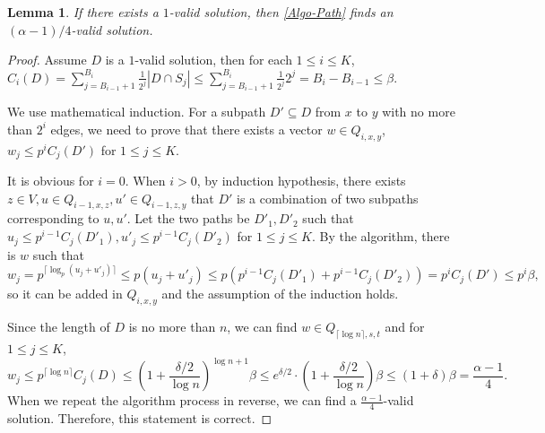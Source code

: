 \documentclass[11pt,a4paper]{article} \usepackage{enumitem}
\newtheorem{lemma}[theorem]{Lemma}
\theoremstyle{definition}
\begin{document}
\begin{lemma}\label{lem:algo-path-1}
If there exists a $1$-valid solution, then \cref{Algo-Path} finds an $(\alpha-1)/4$-valid solution. 
\end{lemma}
\begin{proof}
Assume $D$ is a $1$-valid solution, then for each $1\le i\le K$, $C_i(D)=\sum_{j=B_{i-1}+1}^{B_i} \frac{1}{2^j}|D\cap S_{j}|\le \sum_{j=B_{i-1}+1}^{B_i} \frac{1}{2^j} 2^j=B_i-B_{i-1}\le \beta$. 

We use mathematical induction. For a subpath $D'\subseteq D$ from $x$ to $y$ with no more than $2^i$ edges, we need to prove that there exists a vector $w\in Q_{i,x,y}$, $w_j\le p^i C_j(D')$ for $1\le j\le K$.

It is obvious for $i=0$. When $i>0$, by induction hypothesis, there exists $z\in V, u\in Q_{i-1,x,z},u'\in Q_{i-1,z,y}$ that $D'$ is a combination of two subpaths corresponding to $u,u'$. 
Let the two paths be $D'_1,D'_2$ such that $u_j\le p^{i-1}C_j(D'_1),u'_j\le p^{i-1}C_j(D'_2)$ for $1\le j\le K$.
By the algorithm, there is $w$ such that
$$w_j=p^{\lceil \log_p(u_j+u'_j)\rceil}\le p(u_j+u'_j)\le p(p^{i-1}C_j(D'_1)+p^{i-1}C_j(D'_2))=p^i C_j(D')\le p^i\beta,$$
so it can be added in $Q_{i,x,y}$ and the assumption of the induction holds.

Since the length of $D$ is no more than $n$, we can find $w\in Q_{\lceil \log n\rceil,s,t}$ and for $1\le j\le K$, 
$$w_j\le p^{\lceil \log n\rceil} C_j(D)\le \left( 1+\frac{\delta/2}{\log n}\right)^{\log n+1} \beta\le e^{\delta/2}\cdot \left( 1+\frac{\delta/2}{\log n}\right)\beta\le (1+\delta)\beta=\frac{\alpha-1}{4}.$$
When we repeat the algorithm process in reverse, we can find a $\frac{\alpha-1}{4}$-valid solution. Therefore, this statement is correct.
\end{proof}
\end{document}
